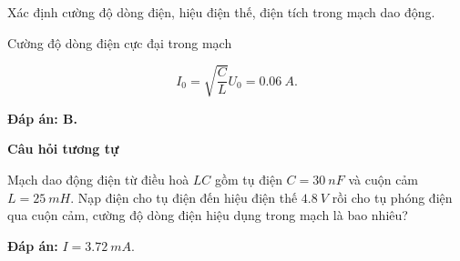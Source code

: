 \begin{dang}{Xác định cường độ dòng điện, hiệu điện thế, điện tích trong mạch dao động.}
{		Cường độ dòng điện cực đại trong mạch 
		
		$$I_{0}=\sqrt{\dfrac{C}{L}} U_{0}=\SI{0,06}{A}.$$
		
		\textbf{Đáp án: B.}
		
		
		\begin{center}
			\textbf{Câu hỏi tương tự}
		\end{center}
		
		Mạch dao động điện từ điều hoà $LC$ gồm tụ điện $C = \SI{30}{nF}$ và cuộn cảm $L = \SI{25}{mH}$. Nạp điện cho tụ điện đến hiệu điện thế $\SI{4,8}{V}$ rồi cho tụ phóng điện qua cuộn cảm, cường độ dòng điện hiệu dụng trong mạch là bao nhiêu?
		
		\textbf{Đáp án:} $I = \SI{3,72}{mA}.$
	}
	

\end{dang}